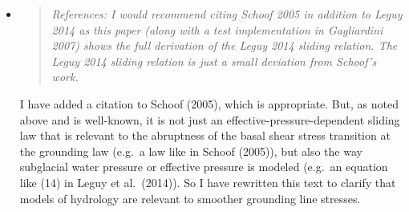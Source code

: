\documentclass[11pt,reqno]{amsart}
\newcommand{\reply}[2]{
\medskip\medskip
\item  \begin{quote}
\emph{#1}
\end{quote}

\medskip
\noindent #2}
\begin{document}
\begin{itemize}
\reply{References: I would recommend citing Schoof 2005 in addition to Leguy 2014 as this paper (along with a test implementation in Gagliardini 2007) shows the full derivation of the Leguy 2014 sliding relation. The Leguy 2014 sliding relation is just a small deviation from Schoof's work.}
{I have added a citation to Schoof (2005), which is appropriate.  But, as noted above and is well-known, it is not just an effective-pressure-dependent sliding law that is relevant to the abruptness of the basal shear stress transition at the grounding law (e.g.~a law like in Schoof (2005)), but also the way subglacial water pressure or effective pressure is modeled (e.g.~an equation like (14) in Leguy et al.~(2014)).  So I have rewritten this text to clarify that models of hydrology are relevant to smoother grounding line stresses.}

\end{itemize}


%
%
\end{document}

